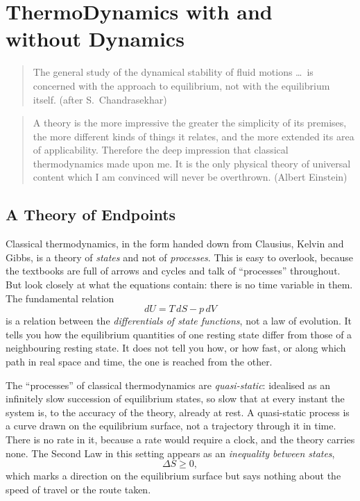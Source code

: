 \chapter{ThermoDynamics with and without Dynamics}\label{ch:withwithout}

\small
\begin{quote}
The general study of the dynamical stability of fluid motions \dots\ is concerned
with the approach to equilibrium, not with the equilibrium itself. (after S.\ Chandrasekhar)
\end{quote}
\begin{quote}
A theory is the more impressive the greater the simplicity of its premises, the
more different kinds of things it relates, and the more extended its area of
applicability. Therefore the deep impression that classical thermodynamics made
upon me. It is the only physical theory of universal content which I am convinced
will never be overthrown. (Albert Einstein)
\end{quote}
\normalsize

\section{A Theory of Endpoints}

Classical thermodynamics, in the form handed down from Clausius, Kelvin and Gibbs,
is a theory of \emph{states} and not of \emph{processes}. This is easy to overlook,
because the textbooks are full of arrows and cycles and talk of ``processes''
throughout. But look closely at what the equations contain: there is no time
variable in them. The fundamental relation
\begin{equation}
  dU = T\,dS - p\,dV
  \label{eq:fund}
\end{equation}
is a relation between the \emph{differentials of state functions}, not a law of
evolution. It tells you how the equilibrium quantities of one resting state differ
from those of a neighbouring resting state. It does not tell you how, or how fast,
or along which path in real space and time, the one is reached from the other.

The ``processes'' of classical thermodynamics are \emph{quasi-static}: idealised as
an infinitely slow succession of equilibrium states, so slow that at every instant
the system is, to the accuracy of the theory, already at rest. A quasi-static
process is a curve drawn on the equilibrium surface, not a trajectory through it in
time. There is no rate in it, because a rate would require a clock, and the theory
carries none. The Second Law in this setting appears as an \emph{inequality between
states},
\begin{equation}
  \Delta S \ge 0,
  \label{eq:second}
\end{equation}
which marks a direction on the equilibrium surface but says nothing about the speed
of travel or the route taken.

